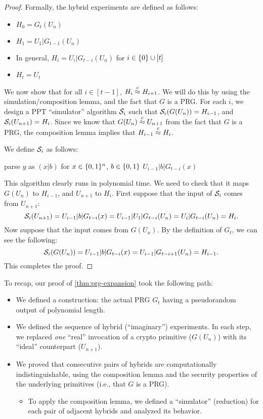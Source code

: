 \documentclass[11pt]{article}
\begin{document}
\begin{proof}
  Formally, the hybrid experiments are defined as follows:
  \begin{itemize}
  \item $H_0 = G_t(U_n)$
  \item $H_1 = U_1 | G_{t-1}(U_n)$
  \item In general, $H_i = U_i | G_{t-i}(U_n)$ for $i \in \{0\} \cup
    [t]$
  \item $H_t = U_{t}$
  \end{itemize}

  We now show that for all $i \in [t-1]$, $H_i \stackrel{c}{\approx} H_{i+1}$.  We
  will do this by using the simulation/composition lemma, and the fact
  that $G$ is a PRG.  For each $i$, we design a PPT ``simulator''
  algorithm $\mathcal{S}_i$ such that $\mathcal{S}_i(G(U_n))=H_{i-1}$, and
  $\mathcal{S}_i(U_{n+1})=H_i$.  Since we know that $G(U_n) \stackrel{c}{\approx} U_{n+1}$
  from the fact that $G$ is a PRG, the composition lemma implies that
  $H_{i-1} \stackrel{c}{\approx} H_i$.

  We define $\mathcal{S}_i$ as follows:
  \begin{algorithm}[h]
    \caption{$\Sim_i(y \in \bit^{n+1})$}
    \begin{algorithmic}
      \STATE parse $y$ as $(x|b)$ for $x \in \{0,1\}^{n}$, $b \in \{0,1\}$
      \RETURN $U_{i-1} | b | G_{t-i}(x)$
    \end{algorithmic}
  \end{algorithm}

  This algorithm clearly runs in polynomial time.  We need to check
  that it maps $G(U_n)$ to $H_{i-1}$, and $U_{n+1}$ to $H_i$.  First
  suppose that the input of $\mathcal{S}_i$ comes from $U_{n+1}$:
  \[ \mathcal{S}_i(U_{n+1})= U_{i-1} | b | G_{t-i}(x) = U_{i-1} | U_1 |
  G_{t-i}(U_n)=U_i | G_{t-i}(U_n) = H_i. \] Now suppose that the input
  comes from $G(U_n)$.  By the definition of $G_t$, we can see the
  following:
  \[ \mathcal{S}_i(G(U_n)) = U_{i-1} | b | G_{t-i}(x) = U_{i-1} |
  G_{t-i+1}(U_n)=H_{i-1}. \]
  This completes the proof.
\end{proof}

\noindent To recap, our proof of \cref{thm:prg-expansion} took
the following path:
\begin{itemize}
\item We defined a construction: the actual PRG $G_t$ having a
  pseudorandom output of polynomial length.
\item We defined the sequence of hybrid (``imaginary'') experiments.
  In each step, we replaced \emph{one} ``real'' invocation of a crypto
  primitive ($G(U_{n})$) with its ``ideal'' counterpart ($U_{n+1}$).
\item We proved that consecutive pairs of hybrids are computationally
  indistinguishable, using the composition lemma and the security
  properties of the underlying primitives (i.e., that $G$ is a PRG).
  \begin{itemize}
  \item To apply the composition lemma, we defined a
    ``simulator'' (reduction) for each pair of adjacent hybrids and
    analyzed its behavior.
  \end{itemize}
\end{itemize}
\end{document}

